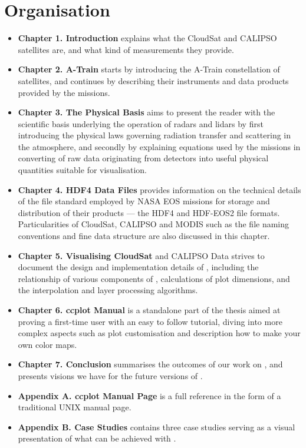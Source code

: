 \section*{Organisation}
\begin{itemize}
\item\textbf{Chapter 1. Introduction} explains what
the CloudSat and CALIPSO satellites are, and what kind of measurements they
provide.

\item\textbf{Chapter 2. A-Train} starts by introducing the A-Train constellation
of
satellites, and continues by
describing their instruments and data products provided by the missions.

\item\textbf{Chapter 3. The Physical Basis} aims to present the reader with the
scientific
basis underlying the operation of radars and lidars by first introducing the
physical laws governing radiation transfer and scattering in the atmosphere, and
secondly by explaining equations used by the missions in converting of raw data
originating from detectors into useful physical quantities suitable for
visualisation.

\item\textbf{Chapter 4. HDF4 Data Files} provides information on the technical
details of the
file standard employed by NASA EOS missions for storage and distribution of
their products --- the HDF4 and HDF-EOS2 file formats. Particularities of
CloudSat, CALIPSO and MODIS such as the file naming conventions and fine data
structure are also discussed in this chapter.

\item\textbf{Chapter 5. Visualising CloudSat} and CALIPSO Data strives to
document the design
and implementation details of \ccplot, including the relationship of various
components of \ccplot, calculations of plot dimensions, and the interpolation
and
layer processing algorithms.

\item\textbf{Chapter 6. ccplot Manual} is a standalone part of the thesis aimed
at proving a
first-time \ccplot user with an easy to follow tutorial, diving into more
complex
aspects such as plot customisation and description how to make your own color
maps.

\item\textbf{Chapter 7. Conclusion} summarises the outcomes of our work on
\ccplot, and
presents visions we have for the future versions of \ccplot.

\item\textbf{Appendix A. ccplot Manual Page} is a full \ccplot reference in the
form of a traditional
UNIX manual
page. 
\item\textbf{Appendix B. Case Studies} contains three case studies serving as a
visual presentation of
what can be achieved with \ccplot.
\end{itemize}

